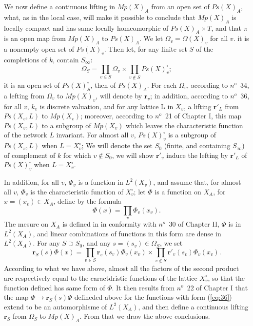 \documentclass[12pt]{amsart}
\def\br{{\mathbf{r}}}
\newcounter{ssection}
\renewcommand{\subsection}{
  \addtocounter{ssection}{1}{\bf  \arabic{ssection}.\  }}
\begin{document}
\subsection{}
We now define a continuous lifting in $Mp(X)_A$ from an open set of 
$Ps(X)_A$,
what, as in the local case, will make it possible to conclude that $Mp(X)_A$ 
is locally compact and has same locally homeomorphic of $Ps(X)_A \times T$,
and that $\pi$ is 
an open map from $Mp(X)_A$ to  $Ps(X)_A$.
We let $\Omega_v = \Omega(X)_v$ for all $v$. 
it is a nonempty open set of $Ps(X)_v$. Then let, for any finite set $S$ of
the completions of $k$, contain $S_\infty$:
\[
\Omega_S=\prod_{v\in S} \Omega_v \times \prod_{v\notin S} Ps(X)_v^\circ;
\] 
it is an open set of $Ps(X)_S^\circ$, then of $Ps(X)_A$. For each $\Omega_v$, 
according to $n^o$~34, a lefting from $\Omega_v$ to $Mp(X)_v$, will denote by 
$\br_v$; in addition, according to $n^o$~36, for all $v$, $k_v$ is discrete valuation, and for any lattice L in $X_v$, a lifting $\br'_L$ from $Ps(X_v,L)$ to
$Mp(X_v)$; moreover, according to $n^o$~21 of Chapter I, 
this map $Ps(X_v, L)$ to a subgroup of $Mp(X_v)$ which leaves 
the characteristic function of the network $L$ invariant.
For almost all $v$, $Ps(X)_v^\circ$ is a subgroup of $Ps(X_v,L)$
 when $L =X_v^\circ$; We will denote the set $S_0$ 
(finite, and containing $S_\infty$) of complement 
of $k$ for which $v\notin S_0$, we will show $\br'_v$ induce
 the lefting by $\br'_L$ of
$Ps(X)_v^\circ$ when $L=X_v^\circ$.

In addition, for all $v$, $\Phi_v$ is a function in  $L^2(X_v)$,
and assume that, for almost all $v$, $\Phi_v$ 
is the characteristic function of $X_v^\circ$; let $\Phi$ is a function on $X_A$,
for $x=(x_v)\in X_A$, define by the formula
\begin{equation}\label{eq:36}
\Phi(x) = \prod_v \Phi_v(x_v).
\end{equation}
The mesure on $X_A$ is defined in in conformity with $n^o$~30 of Chapter II,
$\Phi$ is in $L^2(X_A)$, and linear combinations of  functions in this 
form are dense in $L^2(X_A)$.
For any $S\supset S_0$, and any $s=(s_v)\in \Omega_S$, we set
\[
\br_S(s)\Phi(x) = \prod_{v\in S} \br_v(s_v)\Phi_v(x_v) 
\times \prod_{v\notin S} \br'_v(s_v)\Phi_v(x_v).
\]
According to what we have above,
almost all the factors of the second product are
respectively equal to the caractdristic functions of the lattice $X_v^\circ$,
so that the function defined has same form of $\Phi$.
It then results from $n^o$~22 of Chapter I that 
the map $\Phi\to \br_S(s)\Phi$ defineded above for the functions 
with form (\ref{eq:36}) extend to be an automorphisme of $L^2(X_A)$, and 
then define a continuous lifting $\br_S$ from $\Omega_S$ to $Mp(X)_A$.
From that we draw the above conclusions.  
\end{document}
